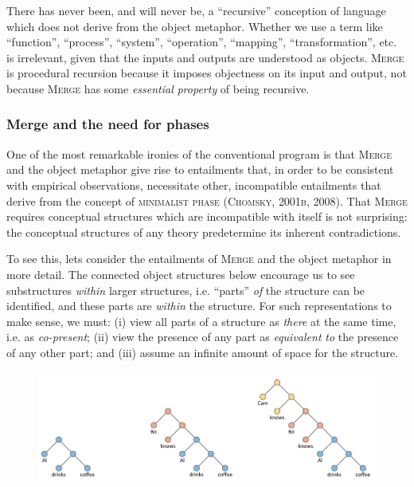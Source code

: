   There has never been, and will never be, a “recursive” conception of language which does not derive from the object metaphor. Whether we use a term like “function”, “process”, “system”, “operation”, “mapping”, “transformation”, etc. is irrelevant, given that the inputs and outputs are understood as objects. \textsc{Merge} is procedural recursion because it imposes objectness on its input and output, not because \textsc{Merge} has some \textit{essential} \textit{property} of being recursive.

\subsubsection{Merge and the need for phases}

One of the most remarkable ironies of the conventional program is that \textsc{Merge} and the object metaphor give rise to entailments that, in order to be consistent with empirical observations, necessitate other, incompatible entailments that derive from the concept of \textsc{minimalist} \textsc{phase} (\textsc{Chomsky,} \textsc{2001b,} \textsc{2008)}. That \textsc{Merge} requires conceptual structures which are incompatible with itself is not surprising: the conceptual structures of any theory predetermine its inherent contradictions.

  To see this, lets consider the entailments of \textsc{Merge} and the object metaphor in more detail. The connected object structures below encourage us to see substructures \textit{within} larger structures, i.e. “parts” \textit{of} the structure can be identified, and these parts are \textit{within} the structure. For such representations to make sense, we must: (i) view all parts of a structure as \textit{there} at the same time, i.e. as \textit{co-present}; (ii) view the presence of any part as \textit{equivalent} \textit{to} the presence of any other part; and (iii) assume an infinite amount of space for the structure.

  
\begin{figure}
\includegraphics[width=\textwidth]{figures/Tilsen-img110.png}
\caption{\missingcaption}
\label{fig:}
\end{figure}
 

